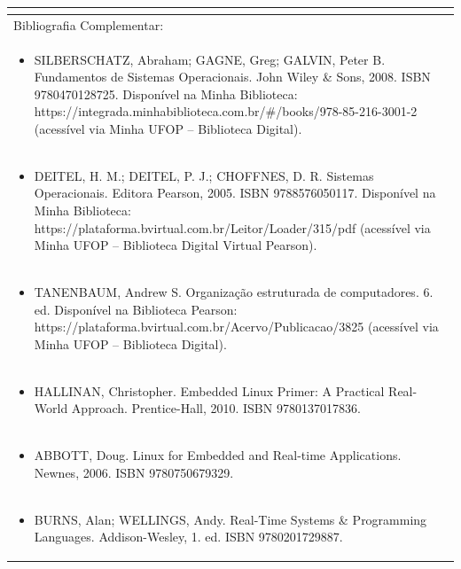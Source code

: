 \documentclass[11pt]{article}
\begin{document}
\begin{center}
\begin{longtable}{|p{4cm}|p{4cm}|p{4cm}|p{4cm}|}
\multicolumn{4}{|p{16cm}|}{}\\
\hline
\multicolumn{4}{|p{16cm}|}{Bibliografia Complementar:}\\*
\multicolumn{4}{|p{\dimexpr 16cm + 6\tabcolsep\relax}|}{\begin{itemize}\item SILBERSCHATZ, Abraham; GAGNE, Greg; GALVIN, Peter B. Fundamentos de Sistemas Operacionais. John Wiley \& Sons, 2008. ISBN 9780470128725. Disponível na Minha Biblioteca: https://integrada.minhabiblioteca.com.br/\#/books/978-85-216-3001-2 (acessível via Minha UFOP – Biblioteca Digital).\end{itemize}}\\
\multicolumn{4}{|p{\dimexpr 16cm + 6\tabcolsep\relax}|}{\begin{itemize}\item DEITEL, H. M.; DEITEL, P. J.; CHOFFNES, D. R. Sistemas Operacionais. Editora Pearson, 2005. ISBN 9788576050117. Disponível na Minha Biblioteca: https://plataforma.bvirtual.com.br/Leitor/Loader/315/pdf (acessível via Minha UFOP – Biblioteca Digital Virtual Pearson).\end{itemize}}\\
\multicolumn{4}{|p{\dimexpr 16cm + 6\tabcolsep\relax}|}{\begin{itemize}\item TANENBAUM, Andrew S. Organização estruturada de computadores. 6. ed. Disponível na Biblioteca Pearson: https://plataforma.bvirtual.com.br/Acervo/Publicacao/3825 (acessível via Minha UFOP – Biblioteca Digital).\end{itemize}}\\
\multicolumn{4}{|p{\dimexpr 16cm + 6\tabcolsep\relax}|}{\begin{itemize}\item HALLINAN, Christopher. Embedded Linux Primer: A Practical Real-World Approach. Prentice-Hall, 2010. ISBN 9780137017836.\end{itemize}}\\
\multicolumn{4}{|p{\dimexpr 16cm + 6\tabcolsep\relax}|}{\begin{itemize}\item ABBOTT, Doug. Linux for Embedded and Real-time Applications. Newnes, 2006. ISBN 9780750679329.\end{itemize}}\\
\multicolumn{4}{|p{\dimexpr 16cm + 6\tabcolsep\relax}|}{\begin{itemize}\item BURNS, Alan; WELLINGS, Andy. Real-Time Systems \& Programming Languages. Addison-Wesley, 1. ed. ISBN 9780201729887.\end{itemize}}\\
\hline
\end{longtable}
\end{center}
\end{document}
